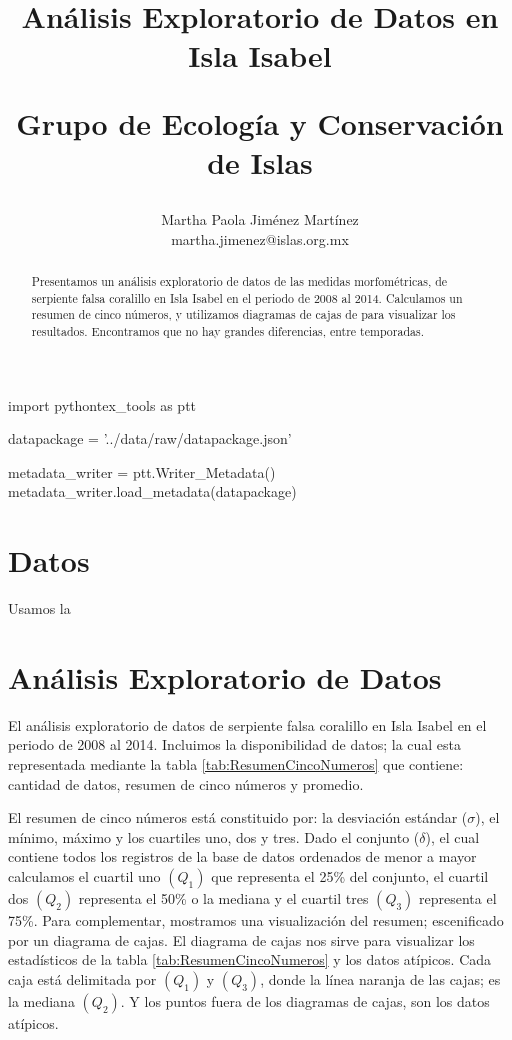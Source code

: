 \documentclass{article}
\begin{document}
 

\author{Martha Paola Jiménez Martínez \\ 
\small{martha.jimenez@islas.org.mx}} 
\title{Análisis Exploratorio de Datos en Isla Isabel \\
\begin{large} Grupo de Ecología y Conservación de Islas \end{large}}  

\maketitle

\begin{abstract}
Presentamos un análisis exploratorio de datos de las medidas morfométricas, de serpiente falsa
coralillo en Isla  Isabel en el periodo de 2008 al 2014. Calculamos un resumen de cinco números, y
utilizamos diagramas de cajas de para visualizar los resultados. Encontramos que no hay grandes
diferencias, entre temporadas.
\end{abstract}

\begin{pycode}
import pythontex_tools as ptt

datapackage = '../data/raw/datapackage.json'

metadata_writer = ptt.Writer_Metadata()
metadata_writer.load_metadata(datapackage)

\end{pycode}

\section*{Datos}
Usamos la 

\section*{Análisis Exploratorio de Datos}
El análisis exploratorio de datos de serpiente falsa coralillo en Isla Isabel en el periodo de 2008
al 2014. Incluimos la disponibilidad de datos; la cual esta representada mediante la tabla
\ref{tab:ResumenCincoNumeros} que contiene: cantidad de datos, resumen de cinco números y promedio.

El resumen de cinco números está constituido por: la desviación estándar ($\sigma$), el mínimo,
máximo y los cuartiles uno, dos y tres. Dado el conjunto
($\delta$), el cual contiene todos los registros de la base de datos ordenados de menor a mayor
calculamos el cuartil uno $(Q_1)$ que representa el 25\% del conjunto, el cuartil
dos $(Q_2)$ representa el 50\% o la mediana y el cuartil tres $(Q_3)$ representa el 75\%.
Para complementar, mostramos una visualización del resumen; escenificado por un diagrama de cajas. 
El diagrama de cajas nos sirve para visualizar los estadísticos de la tabla
\ref{tab:ResumenCincoNumeros} y los datos atípicos. Cada caja está delimitada por $(Q_1)$ y $(Q_3)$,
donde la línea naranja de las cajas; es la mediana $(Q_2)$. Y los puntos fuera de los diagramas
de cajas, son los datos atípicos.
\end{document}

